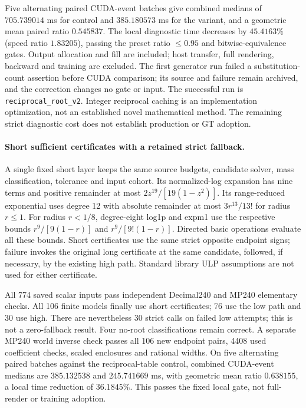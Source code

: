 \documentclass[11pt,a4paper]{article}
\begin{document}
Five alternating paired CUDA-event batches give combined medians of
$705.739014$ ms for control and $385.180573$ ms for the variant, and a
geometric mean paired ratio $0.545837$. The local diagnostic time decreases
by $45.4163\%$ (speed ratio $1.83205$), passing the preset ratio $\leq0.95$
and bitwise-equivalence gates. Output allocation and fill are included;
host transfer, full rendering, backward and training are excluded.
The first generator run failed a substitution-count assertion before CUDA
comparison; its source and failure remain archived, and the correction changes
no gate or input. The successful run is
\texttt{reciprocal\_root\_v2}. Integer reciprocal caching is an implementation
optimization, not an established novel mathematical method. The remaining
strict diagnostic cost does not establish production or GT adoption.

\paragraph{Short sufficient certificates with a retained strict fallback.}
A single fixed short layer keeps the same source budgets, candidate solver,
mass classification, tolerance and input cohort. Its normalized-log expansion
has nine terms and positive remainder at most
$2z^{19}/[19(1-z^2)]$. Its range-reduced exponential uses degree 12 with
absolute remainder at most $3r^{13}/13!$ for radius $r\leq1$.
For radius $r<1/8$, degree-eight log1p and expm1 use the respective bounds
$r^9/[9(1-r)]$ and $r^9/[9!(1-r)]$. Directed basic operations evaluate
all these bounds. Short certificates use the same strict opposite endpoint
signs; failure invokes the original long certificate at the same candidate,
followed, if necessary, by the existing high path. Standard library ULP
assumptions are not used for either certificate.

All 774 saved scalar inputs pass independent Decimal240 and MP240 elementary
checks. All 106 finite models finally use short certificates; 76 use the low
path and 30 use high. There are nevertheless 30 strict calls on failed low
attempts; this is not a zero-fallback result. Four no-root classifications
remain correct. A separate MP240 world inverse check passes all 106 new
endpoint pairs, 4408 used coefficient checks, scaled enclosures and rational
widths. On five alternating paired batches against the reciprocal-table
control, combined CUDA-event medians are $385.132538$ and $245.741669$ ms,
with geometric mean ratio $0.638155$, a local time reduction of $36.1845\%$.
This passes the fixed local gate, not full-render or training adoption.
\end{document}

